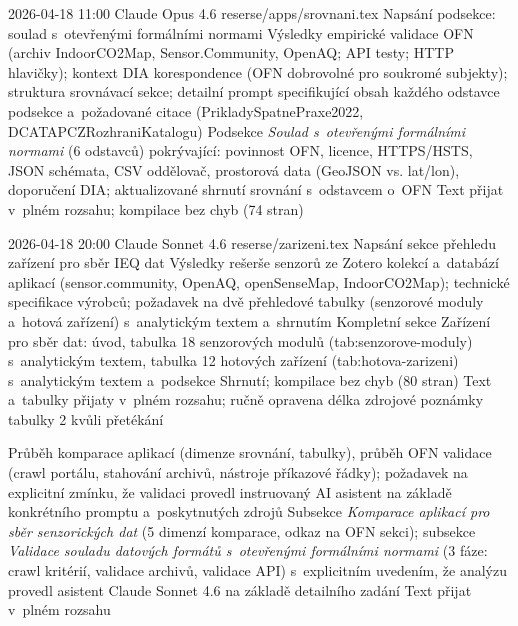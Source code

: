 \logentry
  {2026-04-18 11:00}
  {Claude Opus 4.6}
  {reserse/apps/srovnani.tex}
  {Napsání podsekce: soulad s~otevřenými formálními normami}
  {Výsledky empirické validace OFN (archiv IndoorCO2Map, Sensor.Community, OpenAQ; API testy; HTTP hlavičky); kontext DIA korespondence (OFN dobrovolné pro soukromé subjekty); struktura srovnávací sekce; detailní prompt specifikující obsah každého odstavce podsekce a~požadované citace (PrikladySpatnePraxe2022, DCATAPCZRozhraniKatalogu)}
  {Podsekce \textit{Soulad s~otevřenými formálními normami} (6 odstavců) pokrývající: povinnost OFN, licence, HTTPS/HSTS, JSON schémata, CSV oddělovač, prostorová data (GeoJSON vs. lat/lon), doporučení DIA; aktualizované shrnutí srovnání s~odstavcem o~OFN}
  {Text přijat v~plném rozsahu; kompilace bez chyb (74 stran)}

\logentry
  {2026-04-18 20:00}
  {Claude Sonnet 4.6}
  {reserse/zarizeni.tex}
  {Napsání sekce přehledu zařízení pro sběr IEQ dat}
  {Výsledky rešerše senzorů ze Zotero kolekcí a~databází aplikací (sensor.community, OpenAQ, openSenseMap, IndoorCO2Map); technické specifikace výrobců; požadavek na dvě přehledové tabulky (senzorové moduly a~hotová zařízení) s~analytickým textem a~shrnutím}
  {Kompletní sekce Zařízení pro sběr dat: úvod, tabulka 18 senzorových modulů (tab:senzorove-moduly) s~analytickým textem, tabulka 12 hotových zařízení (tab:hotova-zarizeni) s~analytickým textem a~podsekce Shrnutí; kompilace bez chyb (80 stran)}
  {Text a~tabulky přijaty v~plném rozsahu; ručně opravena délka zdrojové poznámky tabulky 2 kvůli přetékání}

  {Průběh komparace aplikací (dimenze srovnání, tabulky), průběh OFN validace (crawl portálu, stahování archivů, nástroje příkazové řádky); požadavek na explicitní zmínku, že validaci provedl instruovaný AI asistent na základě konkrétního promptu a~poskytnutých zdrojů}
  {Subsekce \textit{Komparace aplikací pro sběr senzorických dat} (5 dimenzí komparace, odkaz na OFN sekci); subsekce \textit{Validace souladu datových formátů s~otevřenými formálními normami} (3 fáze: crawl kritérií, validace archivů, validace API) s~explicitním uvedením, že analýzu provedl asistent Claude Sonnet 4.6 na základě detailního zadání}
  {Text přijat v~plném rozsahu}
